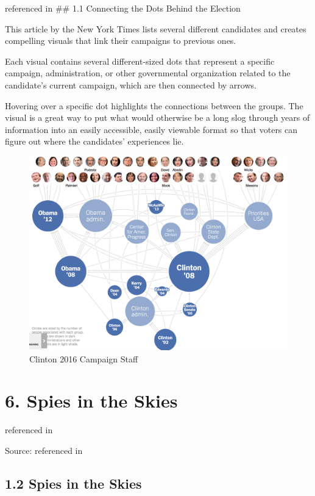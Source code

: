 \documentclass[]{book}
\theoremstyle{definition}
\theoremstyle{definition}
\theoremstyle{definition}
\theoremstyle{remark}
\begin{document}
\citep{campaign_staff} referenced in \citep{cool_data} \#\# 1.1
Connecting the Dots Behind the Election

This article by the New York Times lists several different candidates
and creates compelling visuals that link their campaigns to previous
ones.

Each visual contains several different-sized dots that represent a
specific campaign, administration, or other governmental organization
related to the candidate's current campaign, which are then connected by
arrows.

Hovering over a specific dot highlights the connections between the
groups. The visual is a great way to put what would otherwise be a long
slog through years of information into an easily accessible, easily
viewable format so that voters can figure out where the candidates'
experiences lie.

\begin{figure}
\centering
\includegraphics{images/clinton_campaign.png}
\caption{Clinton 2016 Campaign Staff}
\end{figure}

\section{6. Spies in the Skies}\label{spies-in-the-skies}

\citep{spies_sky} referenced in \citep{cool_data}

Source: \citep{campaign_staff} referenced in \citep{cool_data}

\subsection{1.2 Spies in the Skies}\label{spies-in-the-skies-1}
\end{document}
